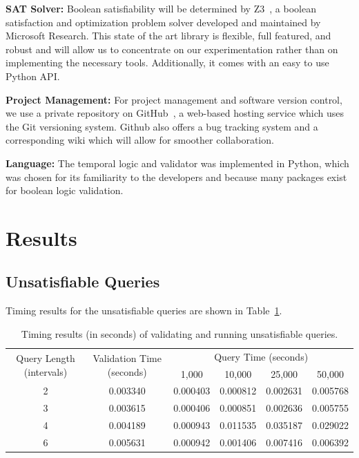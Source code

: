 \documentclass{achemso}
\begin{document}
\textbf{SAT Solver:} Boolean satisfiability will be determined by Z3~\cite{DeMoura:2008}, a boolean satisfaction and optimization problem solver developed and maintained by Microsoft Research. This state of the art library is flexible, full featured, and robust and will allow us to concentrate on our experimentation rather than on implementing the necessary tools.  Additionally, it comes with an easy to use Python API.

\textbf{Project Management:} For project management and software version control, we use a private repository on GitHub~\cite{GitHub:2013}, a web-based hosting service which uses the Git versioning system. Github also offers a bug tracking system and a corresponding wiki which will allow for smoother collaboration.

\textbf{Language:} The temporal logic and validator was implemented in Python, which was chosen for its familiarity to the developers and because many packages exist for boolean logic validation.
\section{Results}
\subsection{Unsatisfiable Queries}
Timing results for the unsatisfiable queries are shown in Table~\ref{tab:unsat-results}. 

\begin{table}
\begin{tabular}{|c||c||c|c|c|c|}\hline
\multirow{2}{*}{Query Length (intervals)} & \multirow{2}{*}{Validation Time (seconds)} &  \multicolumn{4}{|c|}{Query Time (seconds)} \\\cline{3-6}
 & & 1,000 & 10,000 & 25,000 & 50,000  \\\hline\hline
2 & 0.003340 & 0.000403 & 0.000812 & 0.002631 & 0.005768 \\\hline
3 & 0.003615 & 0.000406 & 0.000851 & 0.002636 & 0.005755\\\hline
4 & 0.004189 & 0.000943 & 0.011535 & 0.035187 & 0.029022\\\hline
6 & 0.005631 & 0.000942 & 0.001406 & 0.007416 & 0.006392 \\\hline
\end{tabular}
\caption{Timing results (in seconds) of validating and running unsatisfiable queries.}\label{tab:unsat-results}
\end{table}
\end{document}
